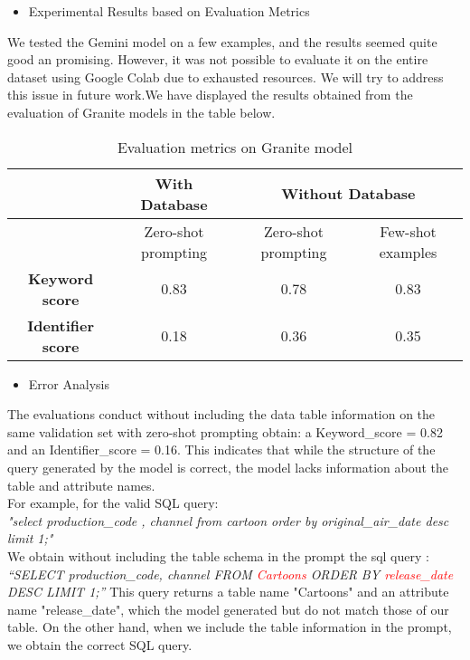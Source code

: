 \documentclass[12pt,a4paper]{article}
\begin{document}
  \begin{itemize}
  \item Experimental Results based on Evaluation Metrics
  \end{itemize}
  We tested the Gemini model on a few examples, and the results seemed quite good an promising. However, it was not possible to evaluate it on the entire dataset using Google Colab due to exhausted resources. We will try to address this issue in future work.We have displayed the results obtained from the evaluation of  Granite models in the table below.

  
  \begin{table}[h]
    \centering
    \small %
    \begin{tabular}{|c|c|c|c|}
        \hline
        & \textbf{ With Database} & \multicolumn{2}{c|}{\textbf{Without Database}} \\ \hline
        & Zero-shot prompting & Zero-shot prompting & Few-shot examples \\ \hline
        \textbf{Keyword score} & 0.83 & 0.78 & 0.83 \\ \hline
        \textbf{Identifier score} & 0.18 & 0.36 & 0.35 \\ \hline
    \end{tabular}
    \caption{Evaluation metrics on Granite model}
    \label{tab:comparison}
  \end{table}
  
  \begin{itemize}
  \item Error Analysis
  \end{itemize}
  
  The evaluations  conduct without including the data table information on the same validation set with zero-shot prompting  obtain: a Keyword\_score = 0.82 and an Identifier\_score = 0.16. 
This indicates that while the structure of the query generated by the model is correct, the model lacks information about the table and attribute names.\\
For example, for the valid SQL query:\\ \textit{"select production\_code ,  channel from cartoon order by original\_air\_date desc limit 1;"\\}
We obtain without including the table schema in the prompt the sql query : \\
\textit{“SELECT production\_code, channel FROM \textcolor{red}{Cartoons} ORDER BY \textcolor{red}{release\_date} DESC LIMIT 1;”}
This query returns a table name "Cartoons" and an attribute name "release\_date", which the model generated but do not match those of our table. On the other hand, when we include the table information in the prompt, we obtain the correct SQL query.\vspace{1cm}
\end{document}
